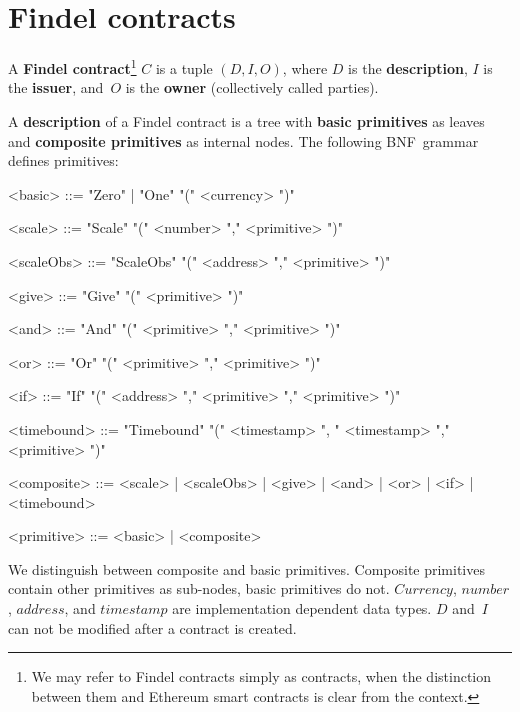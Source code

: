 
\section{Findel contracts} \label{sec:Ch10FindelSyntax}

\begin{definition} \label{def:Ch10FindelFindelContract}
	A \textbf{Findel contract}\footnote{We may refer to Findel contracts simply as contracts, when the distinction between them and Ethereum smart contracts is clear from the context.} $C$ is a tuple $(D,I,O)$, where $D$ is the \textbf{description}, $I$ is the \textbf{issuer}, and~$O$ is the \textbf{owner} (collectively called parties). 
\end{definition}

\begin{definition} \label{def:Ch10FindelDescription}
	A \textbf{description} of a Findel contract is a tree with \textbf{basic primitives} as leaves and \textbf{composite primitives} as internal nodes. The following BNF~grammar defines primitives:
	\begin{grammar}
		
		<basic> ::= "Zero" | "One" "(" <currency> ")"
		
		<scale> ::= "Scale" "(" <number> "," <primitive> ")"
		
		<scaleObs> ::= "ScaleObs" "(" <address> "," <primitive> ")"
		
		<give> ::= "Give" "(" <primitive> ")"
		
		<and> ::= "And" "(" <primitive> "," <primitive> ")"
		
		<or> ::= "Or" "(" <primitive> "," <primitive> ")"
		
		<if> ::= "If" "(" <address> "," <primitive> "," <primitive> ")"
		
		<timebound> ::= "Timebound" "(" <timestamp> ", " <timestamp> "," <primitive> ")"
		
		<composite> ::= <scale> | <scaleObs> | <give> | <and> | <or> | <if> | <timebound>
		
		<primitive> ::= <basic> | <composite>
		
	\end{grammar}
\end{definition}

We distinguish between composite and basic primitives.
Composite primitives contain other primitives as sub-nodes, basic primitives do not.
\(Currency\), \(number\), \(address\), and \(timestamp\) are implementation dependent data types.
$D$ and~$I$ can not be modified after a contract is created.

